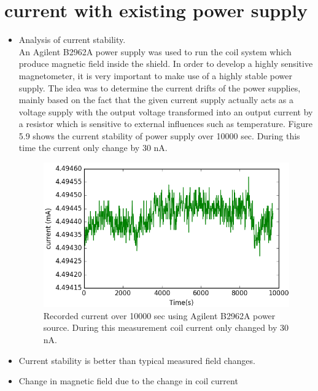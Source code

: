 \documentclass[12pt]{report}
\begin{document}
   \section{current with existing power supply}
   \begin{itemize}
   \item Analysis of current stability.\\
 An Agilent B2962A power supply was used to run the coil system which produce magnetic field inside the shield. In order to develop a highly sensitive magnetometer, it is very important to make use of a highly stable power supply. The idea was to determine the current drifts of the power supplies, mainly based on the fact that the given current supply actually acts as a voltage supply with the output voltage transformed into an output current by a resistor which is sensitive to external influences such as temperature. Figure 5.9 shows the current stability of power supply over 10000 sec. During this time the current only change by 30 nA.  
   \begin{figure}[h]
\centering
\includegraphics[width=0.8\linewidth]{figures/current}
\caption{Recorded current over 10000 sec using Agilent B2962A power source. During this measurement coil current only changed by 30 nA. }
\end{figure}
   \item Current stability is better than typical measured field changes.
   \item Change in magnetic field due to the change in coil current\\

\end{itemize}
\end{document}
